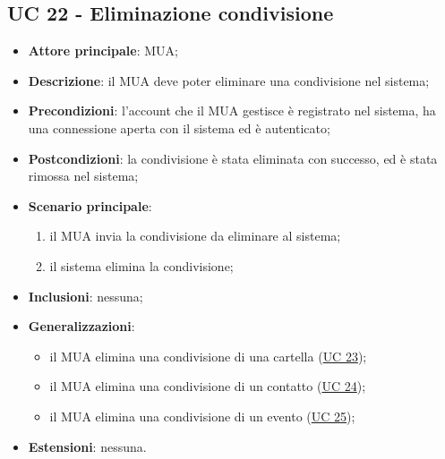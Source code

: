 \subsection{UC 22 - Eliminazione condivisione} \label{sec:UC22}
    \begin{itemize}
        \item \textbf{Attore principale}: MUA;
        \item \textbf{Descrizione}: il MUA deve poter eliminare una condivisione nel sistema;
        \item \textbf{Precondizioni}: l’account che il MUA gestisce è registrato nel sistema, ha una connessione aperta con il sistema ed è autenticato;
        \item \textbf{Postcondizioni}: la condivisione è stata eliminata con successo, ed è stata rimossa nel sistema;
        \item \textbf{Scenario principale}:
            \begin{enumerate}
                \item il MUA invia la condivisione da eliminare al sistema;
                \item il sistema elimina la condivisione;
            \end{enumerate}
        \item \textbf{Inclusioni}: nessuna;
        \item \textbf{Generalizzazioni}:
            \begin{itemize}
                \item il MUA elimina una condivisione di una cartella (\hyperref[sec:UC23]{UC 23});
                \item il MUA elimina una condivisione di un contatto (\hyperref[sec:UC24]{UC 24});
                \item il MUA elimina una condivisione di un evento (\hyperref[sec:UC25]{UC 25});
            \end{itemize}
        \item \textbf{Estensioni}: nessuna.
    \end{itemize}